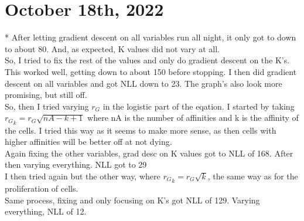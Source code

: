 \documentclass[letterpaper,12pt]{article}
\begin{document}
\section{October 18th, 2022}
* After letting gradient descent on all variables run all night, it only got to down to about 80. And, as expected, K values did not vary at all.
\\
  So, I tried to fix the rest of the values and only do gradient descent on the K's. This worked well, getting down to about 150 before stopping.
I then did gradient descent on all variables and got NLL down to 23. The graph's also look more promising, but still off.
\\
  So, then I tried varying $r_G$ in the logistic part of the eqation. I started by taking ${r_G}_k = r_G \sqrt{nA - k + 1}$ where nA is the number of affinities and k is the affinity of the cells.
I tried this way as it seems to make more sense, as then cells with higher affinities will be better off at not dying.
\\
  Again fixing the other variables, grad desc on K values got to NLL of 168. After then varying everything. NLL got to 29
\\
I then tried again but the other way, where ${r_G}_k = r_G \sqrt{k}$, the same way as for the proliferation of cells.
\\
Same process, fixing and only focusing on K's got NLL of 129. Varying everything, NLL of 12.
\end{document}
